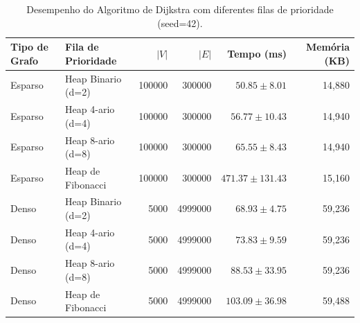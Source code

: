 \begin{table}[htbp]
  \centering
  \caption{Desempenho do Algoritmo de Dijkstra com diferentes filas de prioridade (seed=42).}
  \label{tab:estudo2-cenario2}
  \begin{tabular}{llrrrr}
    \toprule
    \textbf{Tipo de Grafo} & \textbf{Fila de Prioridade} & \textbf{$|V|$} & \textbf{$|E|$} & \textbf{Tempo (ms)} & \textbf{Memória (KB)} \\
    \midrule
    Esparso & Heap Binario (d=2) & 100000 & 300000 & $50.85 \pm 8.01$ & 14,880 \\
    Esparso & Heap 4-ario (d=4) & 100000 & 300000 & $56.77 \pm 10.43$ & 14,940 \\
    Esparso & Heap 8-ario (d=8) & 100000 & 300000 & $65.55 \pm 8.43$ & 14,940 \\
    Esparso & Heap de Fibonacci & 100000 & 300000 & $471.37 \pm 131.43$ & 15,160 \\
    \midrule
    Denso & Heap Binario (d=2) & 5000 & 4999000 & $68.93 \pm 4.75$ & 59,236 \\
    Denso & Heap 4-ario (d=4) & 5000 & 4999000 & $73.83 \pm 9.59$ & 59,236 \\
    Denso & Heap 8-ario (d=8) & 5000 & 4999000 & $88.53 \pm 33.95$ & 59,236 \\
    Denso & Heap de Fibonacci & 5000 & 4999000 & $103.09 \pm 36.98$ & 59,488 \\
    \midrule
    \bottomrule
  \end{tabular}
\end{table}
